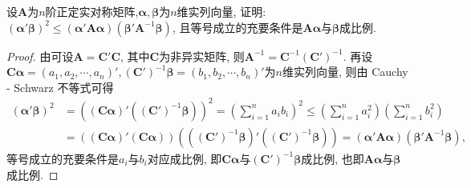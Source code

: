 \documentclass[../../main.tex]{subfiles}%
\begin{document}
\begin{example}
设$\boldsymbol{A}$为$n$阶正定实对称矩阵,$\boldsymbol{\alpha}, \boldsymbol{\beta}$为$n$维实列向量, 证明: $(\boldsymbol{\alpha}'\boldsymbol{\beta})^2\leqslant  (\boldsymbol{\alpha}'\boldsymbol{A}\boldsymbol{\alpha})(\boldsymbol{\beta}'\boldsymbol{A}^{-1}\boldsymbol{\beta})$, 且等号成立的充要条件是$\boldsymbol{A}\boldsymbol{\alpha}$与$\boldsymbol{\beta}$成比例.
\end{example}
\begin{proof}
由可设$\boldsymbol{A}=\boldsymbol{C}'\boldsymbol{C}$, 其中$\boldsymbol{C}$为非异实矩阵, 则$\boldsymbol{A}^{-1}=\boldsymbol{C}^{-1}(\boldsymbol{C}')^{-1}$. 再设$\boldsymbol{C}\boldsymbol{\alpha}=(a_1, a_2, \cdots, a_n)', (\boldsymbol{C}')^{-1}\boldsymbol{\beta}=(b_1, b_2, \cdots, b_n)'$为$n$维实列向量, 则由 Cauchy - Schwarz 不等式可得
\begin{align*}
(\boldsymbol{\alpha}'\boldsymbol{\beta})^2 
&= ((\boldsymbol{C}\boldsymbol{\alpha})'((\boldsymbol{C}')^{-1}\boldsymbol{\beta}))^2 = \left(\sum_{i = 1}^n a_ib_i\right)^2\leqslant  \left(\sum_{i = 1}^n a_i^2\right)\left(\sum_{i = 1}^n b_i^2\right)\\
&= ((\boldsymbol{C}\boldsymbol{\alpha})'(\boldsymbol{C}\boldsymbol{\alpha}))((( \boldsymbol{C}')^{-1}\boldsymbol{\beta})'((\boldsymbol{C}')^{-1}\boldsymbol{\beta})) = (\boldsymbol{\alpha}'\boldsymbol{A}\boldsymbol{\alpha})(\boldsymbol{\beta}'\boldsymbol{A}^{-1}\boldsymbol{\beta}),
\end{align*}
等号成立的充要条件是$a_i$与$b_i$对应成比例, 即$\boldsymbol{C}\boldsymbol{\alpha}$与$(\boldsymbol{C}')^{-1}\boldsymbol{\beta}$成比例, 也即$\boldsymbol{A}\boldsymbol{\alpha}$与$\boldsymbol{\beta}$成比例. 
\end{proof}
\end{document}
